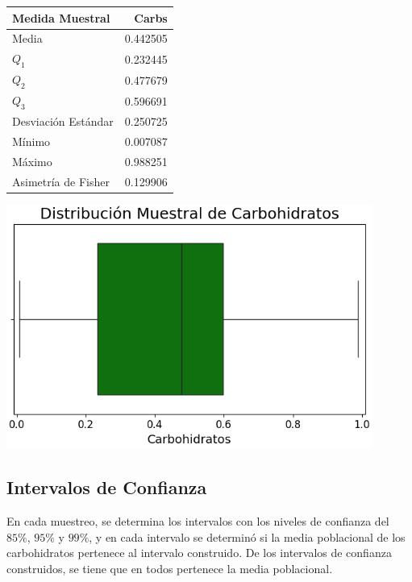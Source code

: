 \documentclass[12pt,a4paper]{article}
\begin{document}
{{            \begin{minipage}{0.35\textwidth}
                \centering
                \begin{tabular}{l|r}
                \toprule
                    Medida Muestral & Carbs \\
                \midrule
                    Media               & 0.442505 \\
                    $Q_1$               & 0.232445 \\
                    $Q_2$               & 0.477679 \\
                    $Q_3$               & 0.596691 \\
                    Desviación Estándar & 0.250725 \\
                    Mínimo              & 0.007087 \\
                    Máximo              & 0.988251 \\
                    Asimetría de Fisher & 0.129906 \\
                \bottomrule
                \end{tabular}
            \end{minipage}%
            \begin{minipage}{0.65\textwidth}
                \centering
                \includegraphics[width=0.9\textwidth]{Resources/Sampling/Stratified.png}
            \end{minipage}
        }
    
        \subsection{Intervalos de Confianza}
        {
            En cada muestreo, se determina los intervalos 
            con los niveles de confianza del $85\%$, $95\%$ y $99\%$, 
            y en cada intervalo se determinó si la media poblacional de 
            los carbohidratos pertenece al intervalo construido. De los 
            intervalos de confianza construidos, se tiene que en todos
            pertenece la media poblacional.\\

}}
\end{document}
